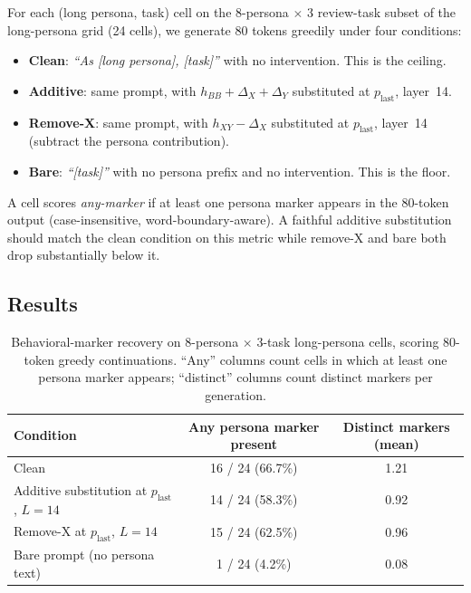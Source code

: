 \documentclass[11pt]{article}
\begin{document}
For each (long persona, task) cell on the 8-persona $\times$ 3 review-task subset of the long-persona grid (24 cells), we generate 80 tokens greedily under four conditions:
\begin{itemize}
    \item \textbf{Clean}: \emph{``As [long persona], [task]''} with no intervention. This is the ceiling.
    \item \textbf{Additive}: same prompt, with $h_{BB} + \Delta_X + \Delta_Y$ substituted at $p_{\text{last}}$, layer~14.
    \item \textbf{Remove-X}: same prompt, with $h_{XY} - \Delta_X$ substituted at $p_{\text{last}}$, layer~14 (subtract the persona contribution).
    \item \textbf{Bare}: \emph{``[task]''} with no persona prefix and no intervention. This is the floor.
\end{itemize}

A cell scores \emph{any-marker} if at least one persona marker appears in the 80-token output (case-insensitive, word-boundary-aware). A faithful additive substitution should match the clean condition on this metric while remove-X and bare both drop substantially below it.

\subsection{Results}

\begin{table}[t]
\centering
\small
\begin{tabular}{lcc}
\toprule
Condition & Any persona marker present & Distinct markers (mean) \\
\midrule
Clean        & 16 / 24 (66.7\%) & 1.21 \\
Additive substitution at $p_{\text{last}}$, $L=14$ & 14 / 24 (58.3\%) & 0.92 \\
Remove-X at $p_{\text{last}}$, $L=14$ & 15 / 24 (62.5\%) & 0.96 \\
Bare prompt (no persona text)        & \phantom{0}1 / 24 (\phantom{0}4.2\%)  & 0.08 \\
\bottomrule
\end{tabular}
\caption{Behavioral-marker recovery on 8-persona $\times$ 3-task long-persona cells, scoring 80-token greedy continuations. ``Any'' columns count cells in which at least one persona marker appears; ``distinct'' columns count distinct markers per generation.}
\label{tab:markers}
\end{table}
\end{document}
